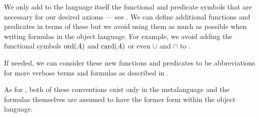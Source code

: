 \begin{remark}
\begin{thmenum}
     We only add to the language itself the functional and predicate symbols that are necessary for our desired axioms --- see . We can define additional functions and predicates in terms of these but we avoid using them as much as possible when writing formulas in the object language. For example, we avoid adding the functional symbols \hyperref[thm:order_type_existence]{\( \operatorname{ord}(A) \)} and \hyperref[def:cardinal]{\( \operatorname{card}(A) \)} or even \hyperref[def:basic_set_operations/union]{\( \cup \)} and \hyperref[def:basic_set_operations/intersection]{\( \cap \)} to \hyperref[def:zfc]{}.

    If needed, we can consider these new functions and predicates to be abbreviations for more verbose terms and formulas as described in .
  \end{thmenum}

  As for , both of these conventions exist only in the metalanguage and the formulas themselves are assumed to have the former form within the object language.
\end{remark}

